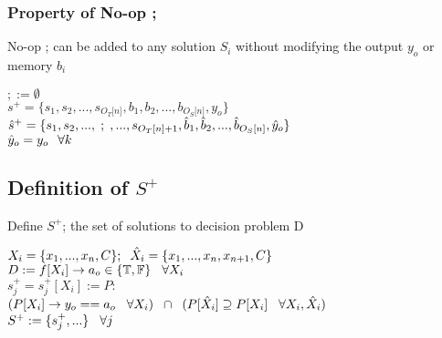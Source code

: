 \documentclass[11pt]{article}
\begin{document}
\subsubsection{Property of No-op ;}
No-op ; can be added to any solution $S_i$ without modifying the output $y_o$ or memory $b_i$
\begin{center}
\vspace{1mm}
$
; := \emptyset
$
\\ \vspace{2mm}
$
s^+ = \{ s_1,s_2,...,s_{O_T \lbrack n \rbrack }, b_1, b_2,...,b_{O_S \lbrack n \rbrack},y_o\}
$
\\ \vspace{2mm}
$
\hat{s}^+ =  \{ s_1,s_2,...,\hspace{1mm};\hspace{1mm},...,s_{O_T \lbrack n \rbrack + 1 }, \hat{b}_1,\hat{b}_2,...,\hat{b}_{O_S \lbrack n \rbrack},\hat{y}_o\}
$
\\ \vspace{2mm}
$
\hat{y}_o = y_o \hspace{2.5mm} \forall k
$
\end{center}





\subsection{Definition of $S^+$}
Define $S^+$; the set of solutions to decision problem D
\begin{center}
$
X_i = \{x_1,...,x_n,C\}; \hspace{2mm} \hat{X}_i = \{x_1,...,x_n,x_{n+1},C\}
$
\\ \vspace{2mm}
$
D := f \lbrack X_i \rbrack \rightarrow a_{o} \in \{\mathbb{T}, \mathbb{F}\} \hspace{3mm} \forall X_i
$
\\ \vspace{2mm}
$
s_j^+ = s_j^+[X_i] := P :
$
\\ \vspace{2mm}
$
(P \lbrack X_i \rbrack \rightarrow y_{o} == a_{o} \hspace{3mm} \forall X_i) \hspace{2mm} \cap \hspace{2mm} (P[\hat{X}_i] \supseteq P[X_i] \hspace{3mm} \forall X_i,\hat{X}_i)
$
\\ \vspace{2mm}
$
S^+ := \{s^+_j,...\} \hspace{3mm} \forall j
$
\end{center}
\end{document}

